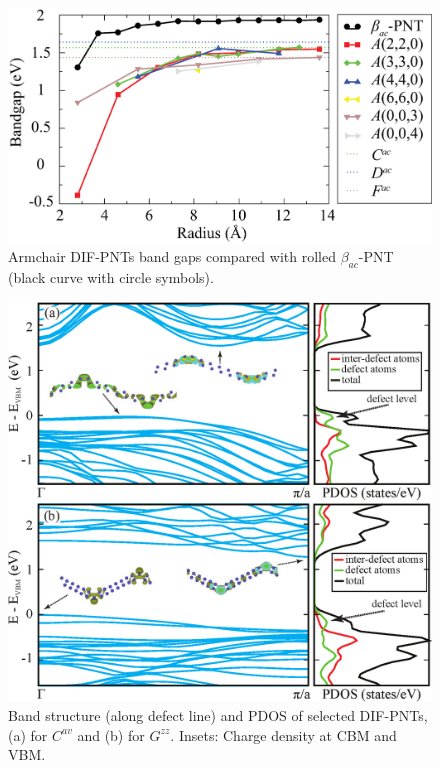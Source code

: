 \begin{figure}[htb]
\centering
\includegraphics[width=0.9\linewidth]{Nanotu_AB.eps}%
\caption{Armchair DIF-PNTs band gaps compared with rolled $\beta_{ac}$-PNT (black curve with circle symbols).  \label{fig-band-A}}
\end{figure}

\begin{figure}[htb]
\centering
\includegraphics[width=0.9\linewidth]{Nanotu_band_pdos.eps}%
\caption{Band structure (along defect line) and PDOS of selected DIF-PNTs, (a) for $C^{av}$ and (b) for $G^{zz}$. Insets: Charge density at CBM and VBM. \label{natu_bands}}
\end{figure}

